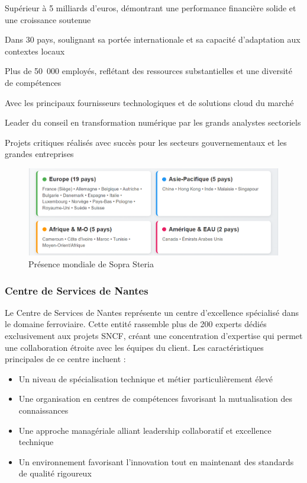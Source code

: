 \begin{description}[leftmargin=3cm, labelwidth=2.5cm]
    \item[Chiffre d'affaires] Supérieur à 5 milliards d'euros, démontrant une performance financière solide et une croissance soutenue
    \item[Présence géographique] Dans 30 pays, soulignant sa portée internationale et sa capacité d'adaptation aux contextes locaux
    \item[Écosystème humain] Plus de 50~000 employés, reflétant des ressources substantielles et une diversité de compétences
    \item[Partenariats stratégiques] Avec les principaux fournisseurs technologiques et de solutions cloud du marché
    \item[Reconnaissance] Leader du conseil en transformation numérique par les grands analystes sectoriels
    \item[Portefeuille] Projets critiques réalisés avec succès pour les secteurs gouvernementaux et les grandes entreprises
\end{description}

\begin{figure}[H]
    \centering
    \includegraphics[scale=0.8]{figures/sopra_presence_mondiale.png}
    \caption{Présence mondiale de Sopra Steria}
    \label{fig:sopra_presence}
\end{figure}

\subsubsection{Centre de Services de Nantes}

Le Centre de Services de Nantes représente un centre d'excellence spécialisé dans le domaine ferroviaire. Cette entité rassemble plus de 200 experts dédiés exclusivement aux projets SNCF, créant une concentration d'expertise qui permet une collaboration étroite avec les équipes du client. Les caractéristiques principales de ce centre incluent :
\begin{itemize}
    \item Un niveau de spécialisation technique et métier particulièrement élevé
    \item Une organisation en centres de compétences favorisant la mutualisation des connaissances
    \item Une approche managériale alliant leadership collaboratif et excellence technique
    \item Un environnement favorisant l'innovation tout en maintenant des standards de qualité rigoureux
\end{itemize}

